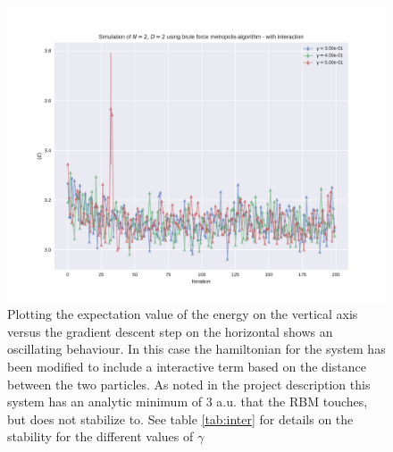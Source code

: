 \begin{figure}
	\includegraphics[width = \textwidth]{figures/interactive_naive.pdf}
\caption{Plotting the expectation value of the energy on the vertical axis versus the gradient descent step on the horizontal shows an oscillating behaviour. In this case the hamiltonian for the system has been modified to include a interactive term based on the distance between the two particles. As noted in the project description this system has an analytic minimum of 3 a.u. that the RBM touches, but does not stabilize to. See table \ref{tab:inter} for details on the stability for the different values of $\gamma$} \label{fig:inter}
\end{figure}
